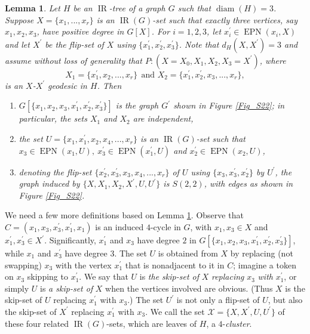 \documentclass[12pt]{article}%
\newtheorem{lemma}[theorem]{Lemma}
\begin{document}
\begin{lemma}
\label{Lem_Not_Path}Let $H$ be an $\operatorname{IR}$-tree of a graph $G$ such
that $\operatorname{diam}(H)=3$. Suppose $X=\{x_{1},...,x_{r}\}$ is an
$\operatorname{IR}(G)$-set such that exactly three vertices, say $x_{1}%
,x_{2},x_{3}$, have positive degree in $G[X]$. For $i=1,2,3$, let
$x_{i}^{\prime}\in\operatorname{EPN}(x_{i},X)$ and let $X^{\prime}$ be the
flip-set of $X$ using $\{x_{1}^{\prime},x_{2}^{\prime},x_{3}^{\prime}\}$. Note
that $d_{H}(X,X^{\prime})=3$ and assume without loss of generality that
$P:(X=X_{0},X_{1},X_{2},X_{3}=X^{\prime})$, where
\[
X_{1}=\{x_{1}^{\prime},x_{2},...,x_{r}\}\ \ \text{and\ \ }X_{2}=\{x_{1}%
^{\prime},x_{2}^{\prime},x_{3},...,x_{r}\},
\]
is an $X$-$X^{\prime}$ geodesic in $H$. Then

\begin{enumerate}
\item[$(i)$] $G[\{x_{1},x_{2},x_{3},x_{1}^{\prime},x_{2}^{\prime}%
,x_{3}^{\prime}\}]$ is the graph $G^{\prime}$ shown in Figure \ref{Fig_S22};
in particular, the sets $X_{1}$ and $X_{2}$ are independent,

\item[$(ii)$] the set $U=\{x_{1},x_{1}^{\prime},x_{2},x_{4},...,x_{r}\}$ is an
$\operatorname{IR}(G)$-set such that $x_{3}\in\operatorname{EPN}%
(x_{1},U),\ x_{3}^{\prime}\in\operatorname{EPN}(x_{1}^{\prime},U)$ and
$x_{2}^{\prime}\in\operatorname{EPN}(x_{2},U)$,

\item[$(iii)$] denoting the flip-set $\{x_{2}^{\prime},x_{3}^{\prime}%
,x_{3},x_{4},...,x_{r}\}$ of $U$ using $\{x_{3},x_{3}^{\prime},x_{2}^{\prime
}\}$ by $U^{\prime}$, the graph induced by $\{X,X_{1},X_{2},X^{\prime
},U,U^{\prime}\}$ is $S(2,2)$, with edges as shown in Figure \ref{Fig_S22}.
\end{enumerate}
\end{lemma}

We need a few more definitions based on Lemma \ref{Lem_Not_Path}. Observe that
$C=(x_{1},x_{3},x_{3}^{\prime},x_{1}^{\prime},x_{1})$ is an induced $4$-cycle
in $G$, with $x_{1},x_{3}\in X$ and $x_{1}^{\prime},x_{3}^{\prime}\in
X^{\prime}$. Significantly, $x_{1}^{\prime}$ and $x_{3}$ have degree $2$ in
$G[\{x_{1},x_{2},x_{3},x_{1}^{\prime},x_{2}^{\prime},x_{3}^{\prime}\}]$, while
$x_{1}$ and $x_{3}^{\prime}$ have degree $3$. The set $U$ is obtained from $X$
by replacing (not swapping) $x_{3}$ with the vertex $x_{1}^{\prime}$ that is
nonadjacent to it in $C$; imagine a token on $x_{3}$ skipping to
$x_{1}^{\prime}$. We say that $U$ is \emph{the skip-set of} $X$
\emph{replacing }$x_{3}$ \emph{with }$x_{1}^{\prime}$, or simply $U$ is
\emph{a skip-set of }$X$ when the vertices involved are obvious. (Thus $X$ is
the skip-set of $U$ replacing $x_{1}^{\prime}$ with $x_{3}$.) The set
$U^{\prime}$ is not only a flip-set of $U$, but also the skip-set of
$X^{\prime}$ replacing $x_{1}^{\prime}$ with $x_{3}$. We call the set
$\mathcal{X}=\{X,X^{\prime},U,U^{\prime}\}$ of these four related
$\operatorname{IR}(G)$-sets, which are leaves of $H$, a $4$-\emph{cluster}.
\end{document}
